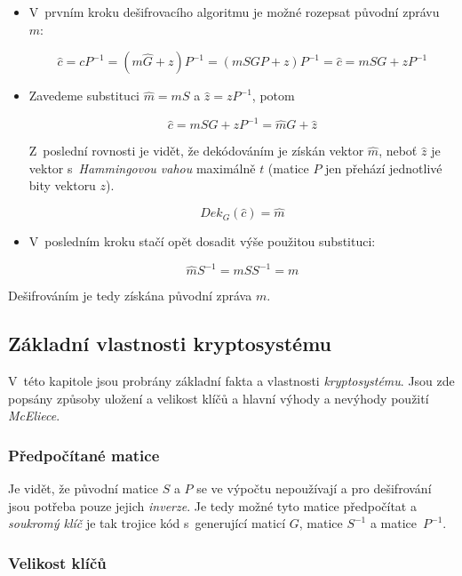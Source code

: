 \documentclass[thesis=M,czech,hidelinks]{FITthesis}[2012/06/26]
\newcommand{\0}{{\textcolor[gray]{0.80}{0}}}
\begin{document}
\begin{itemize}
    \item V~prvním kroku dešifrovacího algoritmu je možné rozepsat původní
        zprávu~$m$:

        $$
            \hat{c} = c P^{-1} = \left( m \hat{G} + z \right) P^{-1} =
            \left(m S G P + z \right) P^{-1} = \hat{c} = m S G + z P^{-1}
        $$

    \item Zavedeme substituci $\hat{m} = m S$ a $\hat{z} = z P^{-1}$, potom

        $$ \hat{c} = m S G + z P^{-1} = \hat{m} G + \hat{z} $$

        Z~poslední rovnosti je vidět, že dekódováním je získán vektor $\hat{m}$,
        neboť $\hat{z}$ je vektor s~\emph{Hammingovou vahou} maximálně $t$
        (matice $P$ jen přehází jednotlivé bity vektoru $z$).

        $$ Dek_{G}\left(\hat{c}\right) = \hat{m} $$

    \item V~posledním kroku stačí opět dosadit výše použitou substituci:

        $$ \hat{m} S^{-1} = m S S^{-1} = m $$

\end{itemize}

Dešifrováním je tedy získána původní zpráva $m$.

\subsection{Základní vlastnosti kryptosystému}

V~této kapitole jsou probrány základní fakta a vlastnosti \emph{kryptosystému}.
Jsou zde popsány způsoby uložení a velikost klíčů a hlavní výhody a nevýhody
použití \emph{McEliece}.

\subsubsection{Předpočítané matice}

Je vidět, že původní matice $S$ a $P$ se ve výpočtu nepoužívají a pro
dešifrování jsou potřeba pouze jejich \emph{inverze}. Je tedy možné tyto matice
předpočítat a \emph{soukromý klíč} je tak trojice kód s~generující maticí $G$,
matice $S^{-1}$ a matice~$P^{-1}$.

\subsubsection{Velikost klíčů}\label{kap_velikost_klicu}
\end{document}
